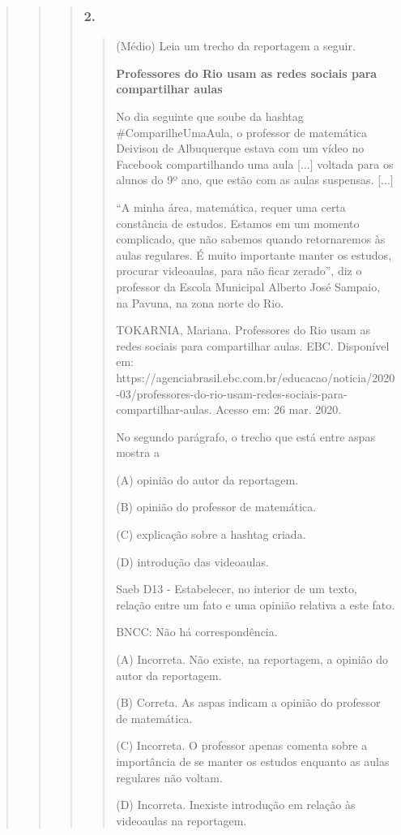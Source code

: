 \begin{quote}
\begin{quote}
\begin{quote}
\subsubsection{2. }\label{section-64}

\begin{quote}
(Médio) Leia um trecho da reportagem a seguir.

\textbf{Professores do Rio usam as redes sociais para compartilhar
aulas}

No dia seguinte que soube da hashtag \#ComparilheUmaAula, o professor de
matemática Deivison de Albuquerque estava com um vídeo no Facebook
compartilhando uma aula {[}...{]} voltada para os alunos do 9º ano, que
estão com as aulas suspensas. {[}...{]}

``A minha área, matemática, requer uma certa constância de estudos.
Estamos em um momento complicado, que não sabemos quando retornaremos às
aulas regulares. É muito importante manter os estudos, procurar
videoaulas, para não ficar zerado'', diz o professor da Escola Municipal
Alberto José Sampaio, na Pavuna, na zona norte do Rio.

TOKARNIA, Mariana. Professores do Rio usam as redes sociais para
compartilhar aulas. EBC. Disponível em:
https://agenciabrasil.ebc.com.br/educacao/noticia/2020-03/professores-do-rio-usam-redes-sociais-para-compartilhar-aulas.
Acesso em: 26 mar. 2020.

\protect\hypertarget{_Hlk128058360}{}{}No segundo parágrafo, o trecho
que está entre aspas mostra a

(A) opinião do autor da reportagem.

(B) opinião do professor de matemática.

(C) explicação sobre a hashtag criada.

(D) introdução das videoaulas.

Saeb D13 - Estabelecer, no interior de um texto, relação entre um fato e
uma opinião relativa a este fato.

BNCC: Não há correspondência.

(A) Incorreta. Não existe, na reportagem, a opinião do autor da
reportagem.

(B) Correta. As aspas indicam a opinião do professor de matemática.

(C) Incorreta. O professor apenas comenta sobre a importância de se
manter os estudos enquanto as aulas regulares não voltam.

(D) Incorreta. Inexiste introdução em relação às videoaulas na
reportagem.
\end{quote}


\end{quote}
\end{quote}
\end{quote}
